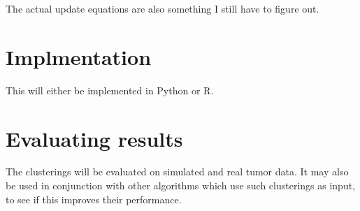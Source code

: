 \documentclass[11pt]{article}
\begin{document}
The actual update equations are also something I still have to figure out.

\section{Implmentation}
This will either be implemented in Python or R.

\section{Evaluating results}

The clusterings will be evaluated on simulated and real tumor data. It may also be used in conjunction with other algorithms which use such clusterings as input, to see if this improves their performance.
\end{document}
